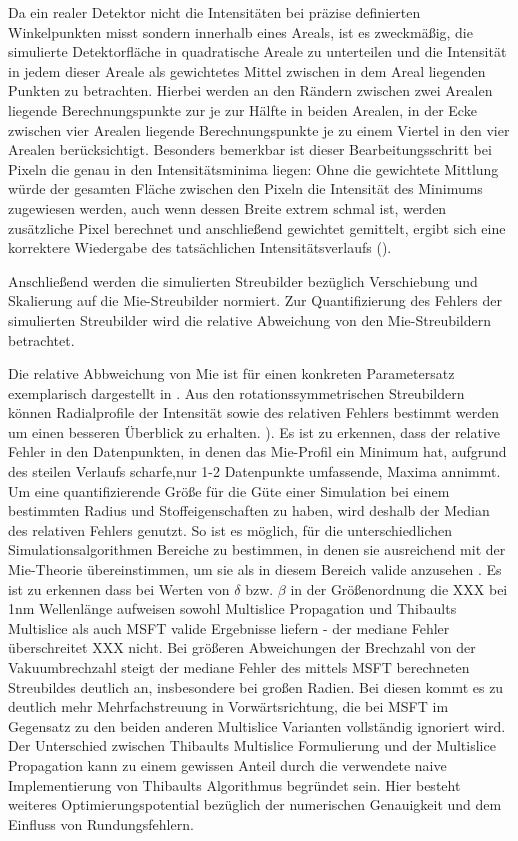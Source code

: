 Da ein realer Detektor nicht die Intensitäten bei präzise definierten Winkelpunkten misst sondern innerhalb eines Areals, ist es zweckmäßig, die simulierte Detektorfläche in quadratische Areale zu unterteilen und die Intensität in jedem dieser Areale als gewichtetes Mittel zwischen in dem Areal liegenden Punkten zu betrachten.
Hierbei werden an den Rändern zwischen zwei Arealen liegende Berechnungspunkte zur je zur Hälfte in beiden Arealen, in der Ecke zwischen vier Arealen liegende Berechnungspunkte je zu einem Viertel in den vier Arealen berücksichtigt.
Besonders bemerkbar ist dieser Bearbeitungsschritt bei Pixeln die genau in den Intensitätsminima liegen: Ohne die gewichtete Mittlung würde der gesamten Fläche zwischen den Pixeln die Intensität des Minimums zugewiesen werden, auch wenn dessen Breite extrem schmal ist, werden zusätzliche Pixel berechnet und anschließend gewichtet gemittelt, ergibt sich eine korrektere Wiedergabe des tatsächlichen Intensitätsverlaufs ().

Anschließend werden die simulierten Streubilder bezüglich Verschiebung und Skalierung auf die Mie-Streubilder normiert. Zur Quantifizierung des Fehlers der simulierten Streubilder wird die relative Abweichung von den Mie-Streubildern betrachtet.

Die relative Abbweichung von Mie ist für einen konkreten Parametersatz exemplarisch dargestellt in . Aus den rotationssymmetrischen Streubildern können Radialprofile der Intensität sowie des relativen Fehlers bestimmt werden um einen besseren Überblick zu erhalten. ).
Es ist zu erkennen, dass der relative Fehler in den Datenpunkten, in denen das Mie-Profil ein Minimum hat, aufgrund des steilen Verlaufs scharfe,nur 1-2 Datenpunkte umfassende, Maxima annimmt.
Um eine quantifizierende Größe für die Güte einer Simulation bei einem bestimmten Radius und Stoffeigenschaften zu haben, wird deshalb der Median des relativen Fehlers genutzt. So ist es möglich, für die unterschiedlichen Simulationsalgorithmen Bereiche zu bestimmen, in denen sie ausreichend mit der Mie-Theorie übereinstimmen, um sie als in diesem Bereich valide anzusehen . Es ist zu erkennen dass bei Werten von $\delta$ bzw. $\beta$ in der Größenordnung die XXX bei 1\si{nm} Wellenlänge aufweisen sowohl Multislice Propagation und Thibaults Multislice als auch MSFT valide Ergebnisse liefern - der mediane Fehler überschreitet XXX nicht. Bei größeren Abweichungen der Brechzahl von der Vakuumbrechzahl steigt der mediane Fehler des mittels MSFT berechneten Streubildes deutlich an, insbesondere bei großen Radien. Bei diesen kommt es zu deutlich mehr Mehrfachstreuung in Vorwärtsrichtung, die bei MSFT im Gegensatz zu den beiden anderen Multislice Varianten vollständig ignoriert wird. Der Unterschied zwischen Thibaults Multislice Formulierung und der Multislice Propagation kann zu einem gewissen Anteil durch die verwendete naive Implementierung von Thibaults Algorithmus begründet sein. Hier besteht weiteres Optimierungspotential bezüglich der numerischen Genauigkeit und dem Einfluss von Rundungsfehlern.


